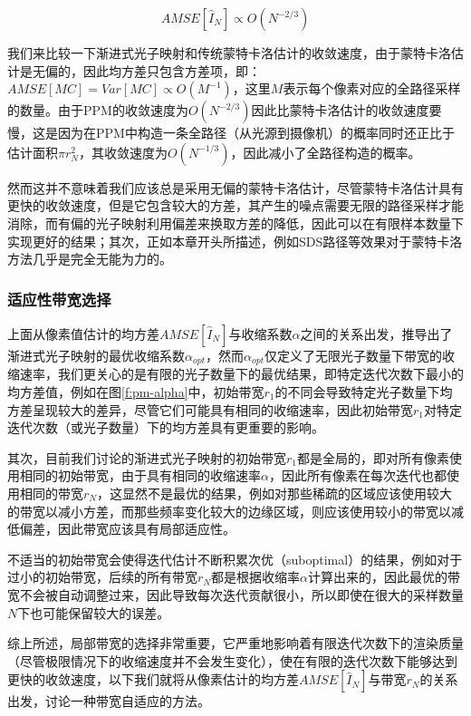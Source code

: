 \begin{equation}
	AMSE[\hat{I}_N]\propto O(N^{-2/3})
\end{equation}

我们来比较一下渐进式光子映射和传统蒙特卡洛估计的收敛速度，由于蒙特卡洛估计是无偏的，因此均方差只包含方差项，即：$AMSE[MC]=Var[MC]\propto O(M^{-1})$，这里$M$表示每个像素对应的全路径采样的数量。由于PPM的收敛速度为$O(N^{-2/3})$因此比蒙特卡洛估计的收敛速度要慢，这是因为在PPM中构造一条全路径（从光源到摄像机）的概率同时还正比于估计面积$\pi r^{2}_N$，其收敛速度为$O(N^{-1/3})$，因此减小了全路径构造的概率。

然而这并不意味着我们应该总是采用无偏的蒙特卡洛估计，尽管蒙特卡洛估计具有更快的收敛速度，但是它包含较大的方差，其产生的噪点需要无限的路径采样才能消除，而有偏的光子映射利用偏差来换取方差的降低，因此可以在有限样本数量下实现更好的结果；其次，正如本章开头所描述，例如SDS路径等效果对于蒙特卡洛方法几乎是完全无能为力的。






\subsubsection{适应性带宽选择}
上面从像素值估计的均方差$AMSE[\hat{I}_N]$与收缩系数$\alpha$之间的关系出发，推导出了渐进式光子映射的最优收缩系数$\alpha_{opt}$，然而$\alpha_{opt}$仅定义了无限光子数量下带宽的收缩速率，我们更关心的是有限的光子数量下的最优结果，即特定迭代次数下最小的均方差值，例如在图\ref{f:pm-alpha}中，初始带宽$r_1$的不同会导致特定光子数量下均方差呈现较大的差异，尽管它们可能具有相同的收缩速率，因此初始带宽$r_1$对特定迭代次数（或光子数量）下的均方差具有更重要的影响。

其次，目前我们讨论的渐进式光子映射的初始带宽$r_1$都是全局的，即对所有像素使用相同的初始带宽，由于具有相同的收缩速率$\alpha$，因此所有像素在每次迭代也都使用相同的带宽$r_N$，这显然不是最优的结果，例如对那些稀疏的区域应该使用较大的带宽以减小方差，而那些频率变化较大的边缘区域，则应该使用较小的带宽以减低偏差，因此带宽应该具有局部适应性。

不适当的初始带宽会使得迭代估计不断积累次优（suboptimal）的结果，例如对于过小的初始带宽，后续的所有带宽$r_N$都是根据收缩率$\alpha$计算出来的，因此最优的带宽不会被自动调整过来，因此导致每次迭代贡献很小，所以即使在很大的采样数量$N$下也可能保留较大的误差。

综上所述，局部带宽的选择非常重要，它严重地影响着有限迭代次数下的渲染质量（尽管极限情况下的收缩速度并不会发生变化），使在有限的迭代次数下能够达到更快的收敛速度，以下我们就将从像素估计的均方差$AMSE[\hat{I}_N]$与带宽$r_N$的关系出发，讨论一种带宽自适应的方法。





